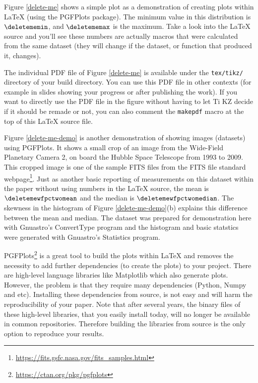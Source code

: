\documentclass[10pt, twocolumn]{article}
\begin{document}
Figure \ref{delete-me} shows a simple plot as a demonstration of creating
plots within \LaTeX{} (using the {\small PGFP}lots package). The minimum
value in this distribution is $\deletememin$, and $\deletememax$ is the
maximum. Take a look into the \LaTeX{} source and you'll see these numbers
are actually macros that were calculated from the same dataset (they will
change if the dataset, or function that produced it, changes).

The individual {\small PDF} file of Figure \ref{delete-me} is available
under the \texttt{tex/tikz/} directory of your build directory. You can use
this PDF file in other contexts (for example in slides showing your
progress or after publishing the work). If you want to directly use the
{\small PDF} file in the figure without having to let {\small T}i{\small
  KZ} decide if it should be remade or not, you can also comment the
\texttt{makepdf} macro at the top of this \LaTeX{} source file.

\begin{figure}[t]

\end{figure}

Figure \ref{delete-me-demo} is another demonstration of showing images
(datasets) using PGFPlots. It shows a small crop of an image from the
Wide-Field Planetary Camera 2, on board the Hubble Space Telescope from
1993 to 2009. This cropped image is one of the sample FITS files from the
FITS file standard
webpage\footnote{\url{https://fits.gsfc.nasa.gov/fits_samples.html}}. Just
as another basic reporting of measurements on this dataset within the paper
without using numbers in the \LaTeX{} source, the mean is
$\deletemewfpctwomean$ and the median is $\deletemewfpctwomedian$. The
skewness in the histogram of Figure \ref{delete-me-demo}(b) explains this
difference between the mean and median. The dataset was prepared for
demonstration here with Gnuastro's \textsf{Convert\-Type} program and the
histogram and basic statstics were generated with Gnuastro's
\textsf{Statistics} program.

{\small PGFP}lots\footnote{\url{https://ctan.org/pkg/pgfplots}} is a great
tool to build the plots within \LaTeX{} and removes the necessity to add
further dependencies (to create the plots) to your project. There are
high-level language libraries like Matplotlib which also generate
plots. However, the problem is that they require many dependencies (Python,
Numpy and etc). Installing these dependencies from source, is not easy and
will harm the reproducibility of your paper. Note that after several years,
the binary files of these high-level libraries, that you easily install
today, will no longer be available in common repositories. Therefore
building the libraries from source is the only option to reproduce your
results.
\end{document}
